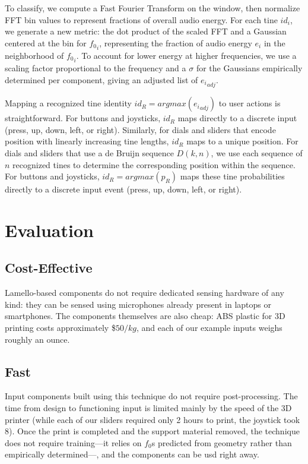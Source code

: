 To classify, we compute a Fast Fourier Transform on the window, then normalize FFT bin values to represent fractions of overall audio energy. For each tine $id_i$, we generate a new metric:  the dot product of the scaled FFT and a Gaussian centered at the bin for ${f_0}_i$, representing the fraction of audio energy $e_i$ in the neighborhood of ${f_0}_i$. To account for lower energy at higher frequencies, we use a scaling factor proportional to the frequency and a $\sigma$ for the Gaussians empirically determined per component, giving an adjusted list of ${e_i}_{adj}$. 

Mapping a recognized tine identity $id_R=argmax({e_i}_{adj})$ to user actions is straightforward. For buttons and joysticks, $id_R$ maps directly to a discrete input (press, up, down, left, or right). Similarly, for dials and sliders that encode position with linearly increasing tine lengths, $id_R$ maps to a unique position. For dials and sliders that use a de Bruijn sequence $D(k, n)$, we use each sequence of $n$ recognized tines to determine the corresponding position within the sequence. For buttons and joysticks, $id_R=argmax(p_R)$ maps these tine probabilities directly to a discrete input event (press, up, down, left, or right).

\section{Evaluation}

    \subsection{Cost-Effective}
    Lamello-based components do not require dedicated sensing hardware of any kind: they can be sensed using microphones already present in laptops or smartphones. The components themselves are also cheap: ABS plastic for 3D printing costs approximately \$$50/kg$, and each of our example inputs weighs roughly an ounce.
    
    \subsection{Fast}
    Input components built using this technique do not require post-processing. The time from design to functioning input is limited mainly by the speed of the 3D printer (while each of our sliders required only 2 hours to print, the joystick took 8). Once the print is completed and the support material removed, the technique does not require training---it relies on $f_0$s predicted from geometry rather than empirically determined---, and the components can be usd right away.

